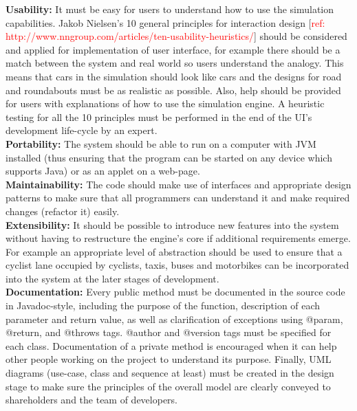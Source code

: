 \documentclass{article}
\begin{document}
\noindent 
\textbf{Usability:} It must be easy for users to understand how to use the simulation capabilities. Jakob Nielsen's 10 general principles for interaction design [\textcolor{red}{ref: http://www.nngroup.com/articles/ten-usability-heuristics/}] should be considered and applied for implementation of user interface, for example there should be a match between the system and real world so users understand the analogy. This means that cars in the simulation should look like cars and the designs for road and roundabouts must be as realistic as possible. Also, help should be provided for users with explanations of how to use the simulation engine. A heuristic testing for all the 10 principles must be performed in the end of the UI’s development life-cycle by an expert. \\

\noindent 
\textbf{Portability:} The system should be able to run on a computer with JVM installed (thus ensuring that the program can be started on any device which supports Java) or as an applet on a web-page. \\

\noindent
\textbf{Maintainability:} The code should make use of interfaces and appropriate design patterns to make sure that all programmers can understand it and make required changes (refactor it) easily.\\

\noindent 
\textbf{Extensibility:} It should be possible to introduce new features into the system without having to restructure the engine’s core if additional requirements emerge. For example an appropriate level of abstraction should be used to ensure that a cyclist lane occupied by cyclists, taxis, buses and motorbikes can be incorporated into the system at the later stages of development.\\

\noindent
\textbf{Documentation:} Every public method must be documented in the source code in Javadoc-style, including the purpose of the function, description of each parameter and return value, as well as clarification of exceptions using @param, @return, and @throws tags. @author and @version tags must be specified for each class. Documentation of a private method is encouraged when it can help other people working on the project to understand its purpose. Finally, UML diagrams (use-case, class and sequence at least) must be created in the design stage to make sure the principles of the overall model are clearly conveyed to shareholders and the team of developers.  
\end{document}
